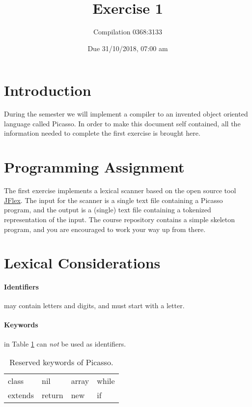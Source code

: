 \documentclass{article}
\begin{document}
\title{Exercise 1}

\author{Compilation 0368:3133}

\date{Due 31/10/2018, 07:00 am}

\maketitle

\section{Introduction}
During the semester we will implement a compiler to an invented
object oriented language called Picasso.
In order to make this document self contained,
all the information needed to complete the first exercise is brought here.

\section{Programming Assignment}
The first exercise implements a lexical scanner based on the
open source tool \href{http://jflex.de/}{JFlex}.
The input for the scanner is a single text file containing a Picasso program,
and the output is a (single) text file containing a tokenized representation of the input.
The course repository contains a simple skeleton program,
and you are encouraged to work your way up from there.

\section{Lexical Considerations}
\paragraph{Identifiers} may contain letters and digits, and must start with a letter.
\paragraph{Keywords} in Table \ref{Table_Reserved_Keywords_of_Picasso} can \textit{not}
be used as identifiers.
\begin{table}[h]
\centering
\begin{tabular}{ l l l l}
class   & nil    & array  & while \\
extends & return & new    & if    \\
\end{tabular}
\caption{
Reserved keywords of Picasso.
\label{Table_Reserved_Keywords_of_Picasso}}
\end{table}
\end{document}
